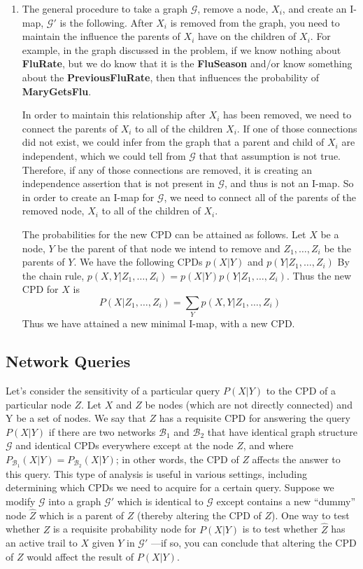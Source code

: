 \documentclass[12pt]{article}
\begin{document}
\begin{enumerate}

	\item The general procedure to take a graph $\mathcal{G}$, remove a node, $X_i$, and create
	an I-map, $\mathcal{G}'$ is the following. After $X_i$ is removed from the graph, you need
	to maintain the influence the parents of $X_i$ have on the children of $X_i$. For example,
	in the graph discussed in the problem, if we know nothing about \textbf{FluRate}, but we
	do know that it is the \textbf{FluSeason} and/or know something about the 
	\textbf{PreviousFluRate}, then that influences the probability of \textbf{MaryGetsFlu}.
	
	In order to maintain this relationship after $X_i$ has been removed, we need
	to connect the parents of $X_i$ to all of the children $X_i$. If one of those connections
	did not exist, we could infer from the graph that a parent and child of $X_i$ are independent,
	which we could tell from $\mathcal{G}$ that that assumption is not true. Therefore, if
	any of those connections are removed, it is creating an independence assertion that is not
	present in $\mathcal{G}$, and thus is not an I-map. So in order to create an I-map for
	$\mathcal{G}$, we need to connect all of the parents of the removed node, $X_i$ to all
	of the children of $X_i$.
	
	The probabilities for the new CPD can be attained as follows. Let $X$ be a node, $Y$ be the parent of that node we intend to remove and $Z_1,\ldots,Z_i$ be the parents of $Y$. We have the following CPDs $p(X|Y)$ and $p(Y|Z_1,\ldots,Z_i)$ By the chain rule, $p(X,Y|Z_1,\ldots,Z_i) = p(X|Y)p(Y|Z_1,\ldots,Z_i)$. Thus the new CPD for $X$ is
	$$
	P(X|Z_1,\ldots,Z_i) = \sum_{Y} p(X,Y|Z_1,\ldots,Z_i)
	$$
Thus we have attained a new minimal I-map, with a new CPD.
\end{enumerate}

\subsection{Network Queries}
Let's consider the sensitivity of a particular query $P(X|Y)$ to the CPD of a particular node $Z$.
Let $X$ and $Z$ be nodes (which are not directly connected) and Y be a set of nodes. We say that $Z$ has a requisite CPD for answering the query $P(X|Y)$ if there are two networks $\mathcal{B}_1$ and $\mathcal{B}_2$
that have identical graph structure $\mathcal{G}$ and identical CPDs everywhere except at the node $Z$, and
where $P_{\mathcal{B}_1}(X|Y) = P_{\mathcal{B}_2}(X|Y)$; in other words, the CPD of $Z$ affects the answer to this query.
This type of analysis is useful in various settings, including determining which CPDs we need
to acquire for a certain query.
Suppose we modify $\mathcal{G}$ into a graph $\mathcal{G}'$
which is identical to $\mathcal{G}$ except contains a new ``dummy''
node $\hat{Z}$ which is a parent of $Z$ (thereby altering the CPD of $Z$). One way to test whether $Z$ is
a requisite probability node for $P(X|Y)$ is to test whether $\hat{Z}$ has an active trail to $X$ given $Y$
in $\mathcal{G}'$ 	—if so, you can conclude that altering the CPD of $Z$ would aﬀect the result of $P(X|Y)$. 
\end{document}
